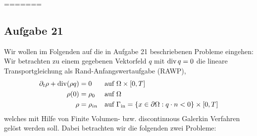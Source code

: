 =======



\newpage
\subsection{Aufgabe 21}

Wir wollen im Folgenden auf die in Aufgabe 21 beschriebenen Probleme eingehen:
Wir betrachten zu einem gegebenen Vektorfeld $q$ mit $ \operatorname{div} q = 0$ die lineare Transportgleichung als Rand-Anfangswertaufgabe (RAWP),
\begin{align*}
 	\partial_t \rho + \operatorname{div} (\rho q) &= 0  &&\text{auf }\Omega \times [0,T] \\
 	\rho(0) &= \rho_0   &&\text{auf } \Omega \\
 	\rho &= \rho_{in}  &&\text{auf } \Gamma_{{\text{in}}} = \{ x \in \partial \Omega: q \cdot n < 0 \} \times [0,T]
\end{align*}
welches mit Hilfe von Finite Volumen- bzw. discontinuous Galerkin Verfahren gelöst werden soll. Dabei betrachten wir die folgenden zwei Probleme:


